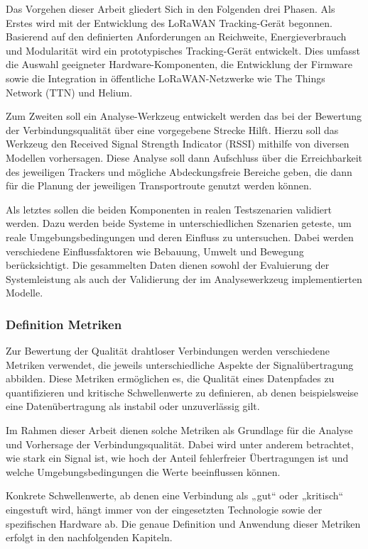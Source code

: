 Das Vorgehen dieser Arbeit gliedert Sich in den Folgenden drei Phasen. Als Erstes wird mit der Entwicklung des LoRaWAN Tracking-Gerät begonnen. Basierend auf den definierten Anforderungen an Reichweite, Energieverbrauch und Modularität wird ein prototypisches Tracking-Gerät entwickelt. Dies umfasst die Auswahl geeigneter Hardware-Komponenten, die Entwicklung der Firmware sowie die Integration in öffentliche LoRaWAN-Netzwerke wie The Things Network (TTN) und Helium. 

Zum Zweiten soll ein Analyse-Werkzeug entwickelt werden das bei der Bewertung der Verbindungsqualität über eine vorgegebene Strecke Hilft. Hierzu soll das Werkzeug den Received Signal Strength Indicator (RSSI) mithilfe von diversen Modellen vorhersagen. Diese Analyse soll dann Aufschluss über die Erreichbarkeit des jeweiligen Trackers und mögliche Abdeckungsfreie Bereiche geben, die dann für die Planung der jeweiligen Transportroute genutzt werden können.

Als letztes sollen die beiden Komponenten in realen Testszenarien validiert werden. Dazu werden beide Systeme in unterschiedlichen Szenarien geteste, um reale Umgebungsbedingungen und deren Einfluss zu untersuchen. Dabei werden verschiedene Einflussfaktoren wie Bebauung, Umwelt und Bewegung berücksichtigt. Die gesammelten Daten dienen sowohl der Evaluierung der Systemleistung als auch der Validierung der im Analysewerkzeug implementierten Modelle.

\subsubsection*{Definition Metriken}
Zur Bewertung der Qualität drahtloser Verbindungen werden verschiedene Metriken verwendet, die jeweils unterschiedliche Aspekte der Signalübertragung abbilden. Diese Metriken ermöglichen es, die Qualität eines Datenpfades zu quantifizieren und kritische Schwellenwerte zu definieren, ab denen beispielsweise eine Datenübertragung als instabil oder unzuverlässig gilt.

Im Rahmen dieser Arbeit dienen solche Metriken als Grundlage für die Analyse und Vorhersage der Verbindungsqualität. Dabei wird unter anderem betrachtet, wie stark ein Signal ist, wie hoch der Anteil fehlerfreier Übertragungen ist und welche Umgebungsbedingungen die Werte beeinflussen können.

Konkrete Schwellenwerte, ab denen eine Verbindung als „gut“ oder „kritisch“ eingestuft wird, hängt immer von der eingesetzten Technologie sowie der spezifischen Hardware ab. Die genaue Definition und Anwendung dieser Metriken erfolgt in den nachfolgenden Kapiteln.